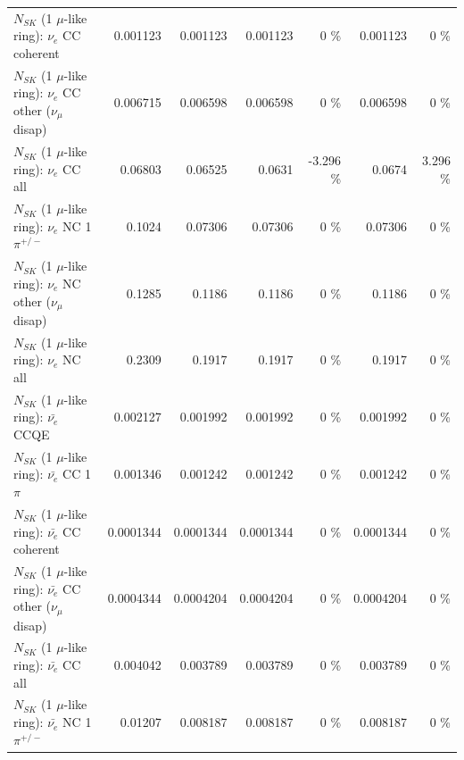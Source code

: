 \begin{table}
\begin{tabular}{| l | r | r | r  r | r  r |}
                               $N_{SK}$ (1 $\mu$-like ring): $\nu_e$ CC coherent &        0.001123 &        0.001123 &        0.001123 &        0 \%  &        0.001123 &        0 \%  \\ 
                $N_{SK}$ (1 $\mu$-like ring): $\nu_e$ CC other ($\nu_\mu$ disap) &        0.006715 &        0.006598 &        0.006598 &        0 \%  &        0.006598 &        0 \%  \\ 
                                  $N_{SK}$ (1 $\mu$-like ring): $\nu_{e}$ CC all &         0.06803 &         0.06525 &          0.0631 &   -3.296 \%  &          0.0674 &    3.296 \%  \\ 
\hline
                           $N_{SK}$ (1 $\mu$-like ring): $\nu_e$ NC 1$\pi^{+/-}$ &          0.1024 &         0.07306 &         0.07306 &        0 \%  &         0.07306 &        0 \%  \\ 
                $N_{SK}$ (1 $\mu$-like ring): $\nu_e$ NC other ($\nu_\mu$ disap) &          0.1285 &          0.1186 &          0.1186 &        0 \%  &          0.1186 &        0 \%  \\ 
                                  $N_{SK}$ (1 $\mu$-like ring): $\nu_{e}$ NC all &          0.2309 &          0.1917 &          0.1917 &        0 \%  &          0.1917 &        0 \%  \\ 
\hline
\hline
\hline
                                $N_{SK}$ (1 $\mu$-like ring): $\bar{\nu_e}$ CCQE &        0.002127 &        0.001992 &        0.001992 &        0 \%  &        0.001992 &        0 \%  \\ 
                           $N_{SK}$ (1 $\mu$-like ring): $\bar{\nu_e}$ CC 1$\pi$ &        0.001346 &        0.001242 &        0.001242 &        0 \%  &        0.001242 &        0 \%  \\ 
                         $N_{SK}$ (1 $\mu$-like ring): $\bar{\nu_e}$ CC coherent &       0.0001344 &       0.0001344 &       0.0001344 &        0 \%  &       0.0001344 &        0 \%  \\ 
          $N_{SK}$ (1 $\mu$-like ring): $\bar{\nu_e}$ CC other ($\nu_\mu$ disap) &       0.0004344 &       0.0004204 &       0.0004204 &        0 \%  &       0.0004204 &        0 \%  \\ 
                            $N_{SK}$ (1 $\mu$-like ring): $\bar{\nu_{e}}$ CC all &        0.004042 &        0.003789 &        0.003789 &        0 \%  &        0.003789 &        0 \%  \\ 
\hline
                     $N_{SK}$ (1 $\mu$-like ring): $\bar{\nu_e}$ NC 1$\pi^{+/-}$ &         0.01207 &        0.008187 &        0.008187 &        0 \%  &        0.008187 &        0 \%  \\ 

\end{tabular}
\end{table}
